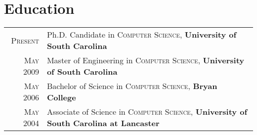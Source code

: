\documentclass[a4paper,10pt]{article}
\begin{document}
\section{Education}
\begin{tabular}{r p{13.5cm}}	
  \textsc{Present} & Ph.D. Candidate in \textsc{Computer Science}, \textbf{University of South Carolina}\\
  \textsc{May} 2009 & Master of Engineering in \textsc{Computer Science}, \textbf{University of South Carolina}\\
  \textsc{May} 2006& Bachelor of Science in \textsc{Computer Science}, \textbf{Bryan College} \\
\textsc{May} 2004& Associate of Science in \textsc{Computer Science}, \textbf{University of South Carolina at Lancaster} \\
\end{tabular}
\end{document}
